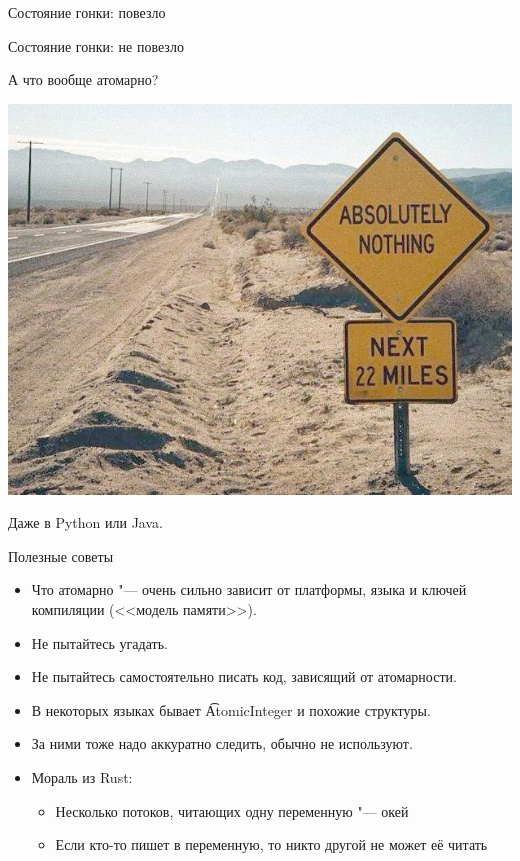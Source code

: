 \begin{frame}[fragile]{Состояние гонки: повезло}
\end{frame}

\begin{frame}[fragile]{Состояние гонки: не повезло}
\end{frame}

\begin{frame}{А что вообще атомарно?}
	\begin{center}
		\includegraphics[scale=0.4]{absolutely-nothing.jpg}
	\end{center}

	Даже в Python или Java.
\end{frame}

\begin{frame}{Полезные советы}
	\begin{itemize}
		\item
			Что атомарно "--- очень сильно зависит от платформы, языка и ключей компиляции
			(<<модель памяти>>).
		\item Не пытайтесь угадать.
		\item Не пытайтесь самостоятельно писать код, зависящий от атомарности.
		\item В некоторых языках бывает \t{AtomicInteger} и похожие структуры.
		\item За ними тоже надо аккуратно следить, обычно не используют.
		\item Мораль из Rust:
			\begin{itemize}
			\item Несколько потоков, читающих одну переменную "--- окей
			\item Если кто-то пишет в переменную, то никто другой не может её читать
			\end{itemize}
	\end{itemize}
\end{frame}
